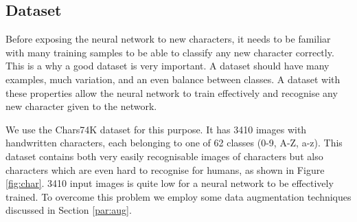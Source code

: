 \documentclass{article}
\begin{document}
\subsection{Dataset}
\label{sec:data}
Before exposing the neural network to new characters, it needs to be familiar with many training samples to be able to classify any new character correctly. 
This is a why a good dataset is very important. A dataset should have many examples, much variation, and an even balance between classes. A dataset with these properties 
allow the neural network to train effectively and recognise any new character given to the network. 

We use the Chars74K dataset for this purpose. It has 3410 images with handwritten characters, each belonging to one of 62 classes (0-9, A-Z, a-z). 
This dataset contains both very easily recognisable images of characters but also characters which are even hard to recognise for humans, as shown in Figure \ref{fig:char}. 
3410 input images is quite low for a neural network to be effectively trained. To overcome this problem we employ some data augmentation techniques discussed in Section \ref{par:aug}. 
\end{document}
